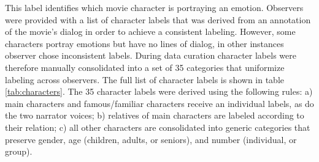 This label identifies which movie character is portraying an emotion. Observers
were provided with a list of character labels that was derived from an
annotation of the movie's dialog in order to achieve a consistent labeling.
However, some characters portray emotions but have no lines of dialog, in other
instances observer chose inconsistent labels. During data curation character
labels were therefore manually consolidated into a set of 35 categories that
uniformize labeling across observers. The full list of character labels is shown in table
\ref{tab:characters}. The 35 character labels were derived using the following
rules: a) main characters and famous/familiar characters receive an individual
labels, as do the two narrator voices; b) relatives of main characters are
labeled according to their relation; c) all other characters are consolidated
into generic categories that preserve gender, age (children, adults, or seniors),
and number (individual, or group).


